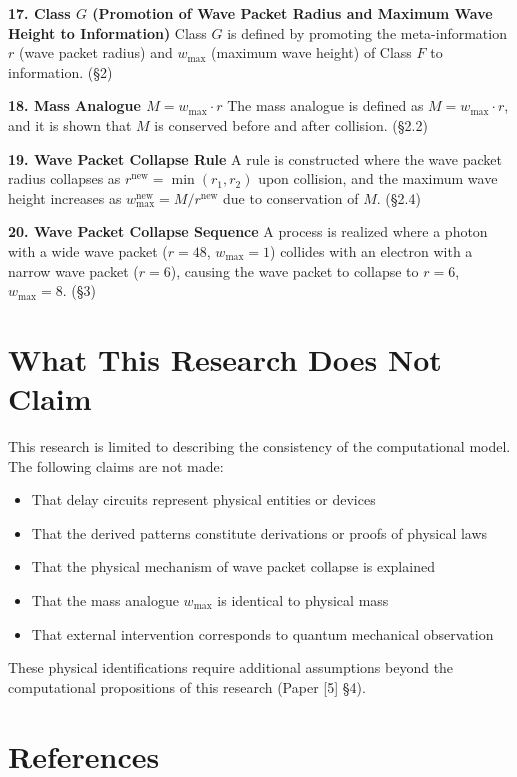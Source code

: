 \documentclass[12pt,a4paper]{article}
\begin{document}
\textbf{17. Class $G$ (Promotion of Wave Packet Radius and Maximum Wave Height to Information)}\quad
Class $G$ is defined by promoting the meta-information $r$ (wave packet radius) and $w_{\max}$ (maximum wave height) of Class $F$ to information. (\S 2)

\textbf{18. Mass Analogue $M = w_{\max} \cdot r$}\quad
The mass analogue is defined as $M = w_{\max} \cdot r$, and it is shown that $M$ is conserved before and after collision. (\S 2.2)

\textbf{19. Wave Packet Collapse Rule}\quad
A rule is constructed where the wave packet radius collapses as $r^{\text{new}} = \min(r_1, r_2)$ upon collision, and the maximum wave height increases as $w_{\max}^{\text{new}} = M / r^{\text{new}}$ due to conservation of $M$. (\S 2.4)

\textbf{20. Wave Packet Collapse Sequence}\quad
A process is realized where a photon with a wide wave packet ($r = 48$, $w_{\max} = 1$) collides with an electron with a narrow wave packet ($r = 6$), causing the wave packet to collapse to $r = 6$, $w_{\max} = 8$. (\S 3)

\section*{What This Research Does Not Claim}

This research is limited to describing the consistency of the computational model. The following claims are not made:

\begin{itemize}
  \item That delay circuits represent physical entities or devices
  \item That the derived patterns constitute derivations or proofs of physical laws
  \item That the physical mechanism of wave packet collapse is explained
  \item That the mass analogue $w_{\max}$ is identical to physical mass
  \item That external intervention corresponds to quantum mechanical observation
\end{itemize}

These physical identifications require additional assumptions beyond the computational propositions of this research (Paper [5] \S 4).

\section*{References}
\end{document}
